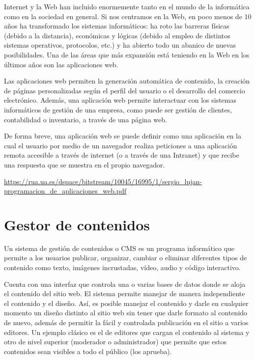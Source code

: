 \cite{sl}Internet y la Web han incluido enormemente tanto en el mundo de la informática
como en la sociedad en general. Si nos centramos en la Web, en poco menos de 10
años ha transformado los sistemas informáticos: ha roto las barreras físicas (debido a
la distancia), económicas y lógicas (debido al empleo de distintos sistemas operativos,
protocolos, etc.) y ha abierto todo un abanico de nuevas posibilidades. Una de las áreas
que más expansión está teniendo en la Web en los últimos años son las aplicaciones
web.

\cite{sl}Las aplicaciones web permiten la generación automática de contenido, la creación
de páginas personalizadas según el perfil del usuario o el desarrollo del comercio electrónico. Además, una aplicación web permite interactuar con los sistemas informáticos de gestión de una empresa, como puede ser gestión de clientes, contabilidad o
inventario, a través de una página web.

\cite{sl}De forma breve, una aplicación web se puede definir como una aplicación en la cual el usuario por medio de un navegador realiza peticiones a una aplicación remota accesible a través de internet (o a través de una Intranet) y que recibe una respuesta que se muestra en el propio navegador.

\begin{remark}
	\url{https://rua.ua.es/dspace/bitstream/10045/16995/1/sergio_lujan-programacion_de_aplicaciones_web.pdf}
\end{remark}


\section{Gestor de contenidos}

\cite{mdn}Un sistema de gestión de contenidos o CMS es un programa informático que permite a los usuarios publicar, organizar, cambiar o eliminar diferentes tipos de contenido como texto, imágenes incrustadas, vídeo, audio y código interactivo.

\cite{wiki}Cuenta con una interfaz que controla una o varias bases de datos donde se aloja el contenido del sitio web. El sistema permite manejar de manera independiente el contenido y el diseño. Así, es posible manejar el contenido y darle en cualquier momento un diseño distinto al sitio web sin tener que darle formato al contenido de nuevo, además de permitir la fácil y controlada publicación en el sitio a varios editores. Un ejemplo clásico es el de editores que cargan el contenido al sistema y otro de nivel superior (moderador o administrador) que permite que estos contenidos sean visibles a todo el público (los aprueba).

